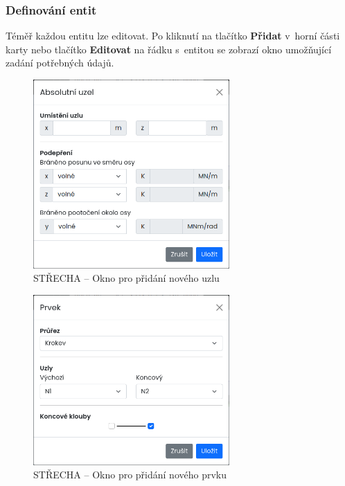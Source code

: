 \subsubsection*{Definování entit}
Téměř každou entitu lze editovat. Po kliknutí na tlačítko \textbf{Přidat} v~horní části karty nebo tlačítko \textbf{Editovat} na řádku s~entitou se zobrazí okno umožňující zadání potřebných údajů.
\begin{figure}[H]
    \includegraphics[width=7.5cm]{assets/figures/wbapp/add_node_modal.png}
    \caption{STŘECHA -- Okno pro přidání nového uzlu}
    \label{fig:add_node}
\end{figure}

\begin{figure}[H]
    \includegraphics[width=7.5cm]{assets/figures/wbapp/add_member_modal.png}
    \caption{STŘECHA -- Okno pro přidání nového prvku}
    \label{fig:add_member}
\end{figure}

